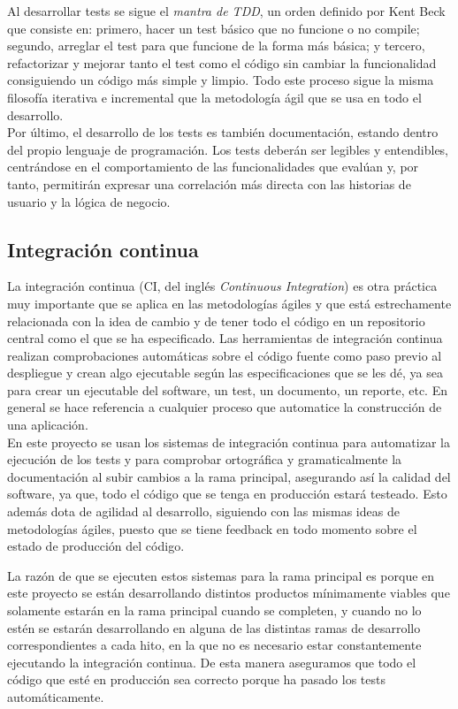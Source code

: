 Al desarrollar tests se sigue el \textit{mantra de TDD}, un orden definido por
Kent Beck \cite{beck2002driven} que consiste en: primero, hacer un test básico
que no funcione o no compile; segundo, arreglar el test para que funcione de la
forma más básica; y tercero, refactorizar y mejorar tanto el test como el código
sin cambiar la funcionalidad consiguiendo un código más simple y limpio. Todo
este proceso sigue la misma filosofía iterativa e incremental que la metodología
ágil que se usa en todo el desarrollo.\\

Por último, el desarrollo de los tests es también documentación, estando dentro
del propio lenguaje de programación. Los tests deberán ser legibles y
entendibles, centrándose en el comportamiento de las funcionalidades que evalúan
y, por tanto, permitirán expresar una correlación más directa con las historias
de usuario y la lógica de negocio.

\subsection{Integración continua}
La integración continua (CI, del inglés \textit{Continuous Integration}) es otra
práctica muy importante que se aplica en las metodologías ágiles y que está
estrechamente relacionada con la idea de cambio y de tener todo el código en un
repositorio central como el que se ha especificado. Las herramientas de
integración continua realizan comprobaciones automáticas sobre el código fuente
como paso previo al despliegue y crean algo ejecutable según las
especificaciones que se les dé, ya sea para crear un ejecutable del software, un
test, un documento, un reporte, etc. En general se hace referencia a cualquier
proceso que automatice la construcción de una aplicación.\\

En este proyecto se usan los sistemas de integración continua para automatizar
la ejecución de los tests y para comprobar ortográfica y gramaticalmente la
documentación al subir cambios a la rama principal, asegurando así la calidad
del software, ya que, todo el código que se tenga en producción estará testeado.
Esto además dota de agilidad al desarrollo, siguiendo con las mismas ideas de
metodologías ágiles, puesto que se tiene feedback en todo momento sobre el
estado de producción del código.

La razón de que se ejecuten estos sistemas para la rama principal es porque en
este proyecto se están desarrollando distintos productos mínimamente viables que
solamente estarán en la rama principal cuando se completen, y cuando no lo estén
se estarán desarrollando en alguna de las distintas ramas de desarrollo
correspondientes a cada hito, en la que no es necesario estar constantemente
ejecutando la integración continua. De esta manera aseguramos que todo el código
que esté en producción sea correcto porque ha pasado los tests
automáticamente.\\

